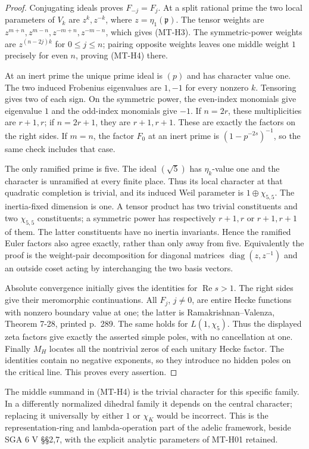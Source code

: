 \documentclass[11pt,a4paper]{article}
\begin{document}
\begin{proof}
Conjugating ideals proves $F_{-j}=F_j$. At a split rational prime
the two local parameters of $V_k$ are $z^k,z^{-k}$, where
$z=\eta_1(\mathfrak p)$. The tensor weights are
$z^{m+n},z^{m-n},z^{-m+n},z^{-m-n}$, which gives (MT-H3).
The symmetric-power weights are $z^{(n-2j)k}$ for $0\le j\le n$;
pairing opposite weights leaves one middle weight $1$ precisely for
even $n$, proving (MT-H4) there.

At an inert prime the unique prime ideal is $(p)$ and has character
value one. The two induced Frobenius eigenvalues are $1,-1$ for
every nonzero $k$. Tensoring gives two of each sign. On the
symmetric power, the even-index monomials give eigenvalue $1$ and
the odd-index monomials give $-1$. If $n=2r$, these multiplicities
are $r+1,r$; if $n=2r+1$, they are $r+1,r+1$. These are exactly
the factors on the right sides. If $m=n$, the factor $F_0$ at an
inert prime is $(1-p^{-2s})^{-1}$, so the same check includes that
case.

The only ramified prime is five. The ideal $(\sqrt5)$ has
$\eta_k$-value one and the character is unramified at every finite
place. Thus its local character at that quadratic completion is
trivial, and its induced Weil parameter is $1\oplus\chi_{5,5}$.
The inertia-fixed dimension is one. A tensor product has two
trivial constituents and two $\chi_{5,5}$ constituents; a symmetric
power has respectively $r+1,r$ or $r+1,r+1$ of them. The latter
constituents have no inertia invariants. Hence the ramified Euler
factors also agree exactly, rather than only away from five.
Equivalently the proof is the weight-pair decomposition for diagonal
matrices $\operatorname{diag}(z,z^{-1})$ and an outside coset
acting by interchanging the two basis vectors.

Absolute convergence initially gives the identities for
$\operatorname{Re}s>1$. The right sides give their meromorphic
continuations. All $F_j$, $j\ne0$, are entire Hecke functions with
nonzero boundary value at one; the latter is Ramakrishnan--Valenza,
Theorem 7-28, printed p.~289. The same holds for $L(1,\chi_5)$.
Thus the displayed zeta factors give exactly the asserted simple
poles, with no cancellation at one. Finally $M_H$ locates all the
nontrivial zeros of each unitary Hecke factor. The identities contain
no negative exponents, so they introduce no hidden poles on the
critical line. This proves every assertion.
\end{proof}

The middle summand in (MT-H4) is the trivial character for this
specific family. In a differently normalized dihedral family it
depends on the central character; replacing it universally by either
$1$ or $\chi_K$ would be incorrect. This is the representation-ring
and lambda-operation part of the adelic framework, beside SGA 6 V
\S\S2,7, with the explicit analytic parameters of MT-H01 retained.
\end{document}
